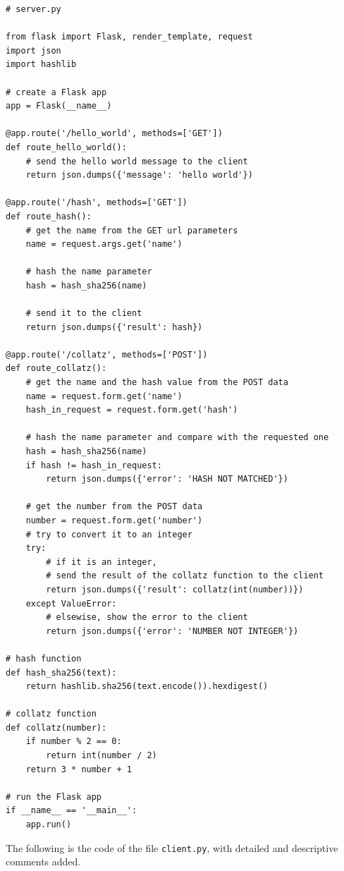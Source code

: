 \documentclass{homework}
\begin{document}
\begin{verbatim}
# server.py

from flask import Flask, render_template, request
import json
import hashlib

# create a Flask app
app = Flask(__name__)

@app.route('/hello_world', methods=['GET'])
def route_hello_world():
    # send the hello world message to the client
    return json.dumps({'message': 'hello world'})

@app.route('/hash', methods=['GET'])
def route_hash():
    # get the name from the GET url parameters
    name = request.args.get('name')

    # hash the name parameter
    hash = hash_sha256(name)

    # send it to the client
    return json.dumps({'result': hash})

@app.route('/collatz', methods=['POST'])
def route_collatz():
    # get the name and the hash value from the POST data
    name = request.form.get('name')
    hash_in_request = request.form.get('hash')

    # hash the name parameter and compare with the requested one
    hash = hash_sha256(name)
    if hash != hash_in_request:
        return json.dumps({'error': 'HASH NOT MATCHED'})

    # get the number from the POST data
    number = request.form.get('number')
    # try to convert it to an integer
    try:
        # if it is an integer,
        # send the result of the collatz function to the client
        return json.dumps({'result': collatz(int(number))})
    except ValueError:
        # elsewise, show the error to the client
        return json.dumps({'error': 'NUMBER NOT INTEGER'})

# hash function
def hash_sha256(text):
    return hashlib.sha256(text.encode()).hexdigest()

# collatz function
def collatz(number):
    if number % 2 == 0:
        return int(number / 2)
    return 3 * number + 1

# run the Flask app
if __name__ == '__main__':
    app.run()
\end{verbatim}

The following is the code of the file \texttt{client.py}, with detailed and descriptive comments added.
\end{document}
